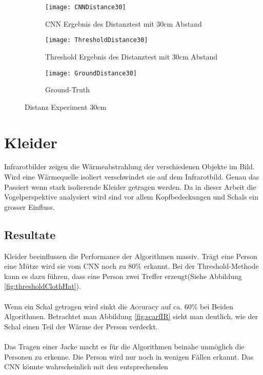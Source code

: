 \begin{figure}[H]
	\begin{subfigure}{.45\linewidth}
		\centering
		\texttt{[image: CNNDistance30]}
		\caption{CNN Ergebnis des Distanztest mit 30cm Abstand}
		\label{fig:cnnDistance30}
	\end{subfigure}\hfill%
	\begin{subfigure}{.45\linewidth}
		\centering
		\texttt{[image: ThresholdDistance30]}
		\caption{Threshold Ergebnis des Distanztest mit 30cm Abstand}
		\label{fig:thresholdDistance30}
	\end{subfigure}
	\begin{subfigure}{\linewidth}
		\centering
		\texttt{[image: GroundDistance30]}
		\caption{Ground-Truth}
		\label{fig:groundDistance30}
	\end{subfigure}
	\caption{Distanz Experiment 30cm}
	\label{fig:Distance30}
\end{figure}

\section{Kleider}
\label{sec:cloths}

Infrarotbilder zeigen die Wärmeabstrahlung der verschiedenen Objekte im Bild. Wird eine Wärmequelle isoliert verschwindet sie auf dem Infrarotbild. Genau das Passiert wenn stark isolierende Kleider getragen werden. Da in dieser Arbeit die Vogelperspektive analysiert wird sind vor allem Kopfbedeckungen und Schals ein grosser Einfluss.

\subsection{Resultate}
Kleider beeinflussen die Performance der Algorithmen massiv. Trägt eine Person eine Mütze wird sie vom CNN noch zu 80\% erkannt. Bei der Threshold-Methode kann es dazu führen, dass eine Person zwei Treffer erzeugt(Siehe Abbildung \ref{fig:thresholdClothHat}).\\
\\
Wenn ein Schal getragen wird sinkt die Accuracy auf ca. 60\% bei Beiden Algorithmen. Betrachtet man Abbildung \ref{fig:scarfIR} sieht man deutlich, wie der Schal einen Teil der Wärme der Person verdeckt.\\
\\
Das Tragen einer Jacke macht es für die Algorithmen beinahe unmöglich die Personen zu erkenne. Die Person wird nur noch in wenigen Fällen erkannt. Das CNN könnte wahrscheinlich mit den entsprechenden

